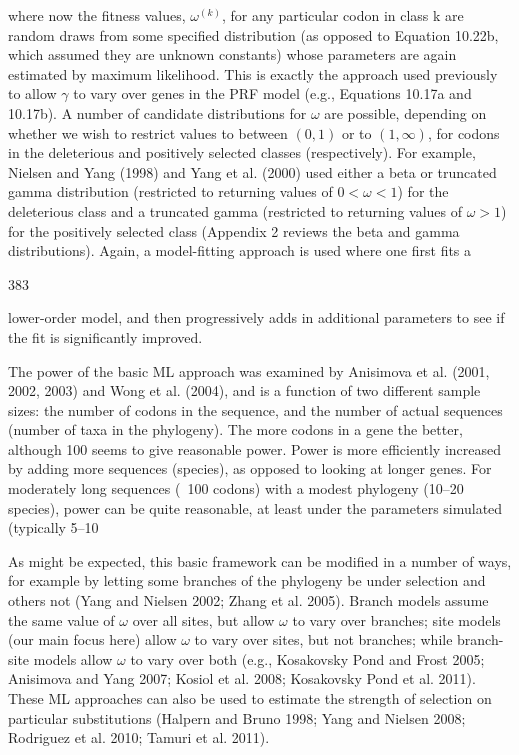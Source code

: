 \documentclass{article}
\begin{document}
where now the fitness values,  $ \omega^{(k)} $, for any particular codon in class k are random draws from some specified distribution (as opposed to Equation 10.22b, which assumed they are unknown constants) whose parameters are again estimated by maximum likelihood. This is exactly the approach used previously to allow  $ \gamma $ to vary over genes in the PRF model (e.g., Equations 10.17a and 10.17b). A number of candidate distributions for  $ \omega $ are possible, depending on whether we wish to restrict values to between  $ (0, 1) $ or to  $ (1, \infty) $, for codons in the deleterious and positively selected classes (respectively). For example, Nielsen and Yang (1998) and Yang et al. (2000) used either a beta or truncated gamma distribution (restricted to returning values of  $ 0 < \omega < 1 $) for the deleterious class and a truncated gamma (restricted to returning values of  $ \omega > 1 $) for the positively selected class (Appendix 2 reviews the beta and gamma distributions). Again, a model-fitting approach is used where one first fits a

383

lower-order model, and then progressively adds in additional parameters to see if the fit is significantly improved.

The power of the basic ML approach was examined by Anisimova et al. (2001, 2002, 2003) and Wong et al. (2004), and is a function of two different sample sizes: the number of codons in the sequence, and the number of actual sequences (number of taxa in the phylogeny). The more codons in a gene the better, although 100 seems to give reasonable power. Power is more efficiently increased by adding more sequences (species), as opposed to looking at longer genes. For moderately long sequences (~100 codons) with a modest phylogeny (10–20 species), power can be quite reasonable, at least under the parameters simulated (typically 5–10%

As might be expected, this basic framework can be modified in a number of ways, for example by letting some branches of the phylogeny be under selection and others not (Yang and Nielsen 2002; Zhang et al. 2005). Branch models assume the same value of  $ \omega $ over all sites, but allow  $ \omega $ to vary over branches; site models (our main focus here) allow  $ \omega $ to vary over sites, but not branches; while branch-site models allow  $ \omega $ to vary over both (e.g., Kosakovsky Pond and Frost 2005; Anisimova and Yang 2007; Kosiol et al. 2008; Kosakovsky Pond et al. 2011). These ML approaches can also be used to estimate the strength of selection on particular substitutions (Halpern and Bruno 1998; Yang and Nielsen 2008; Rodriguez et al. 2010; Tamuri et al. 2011).
\end{document}
